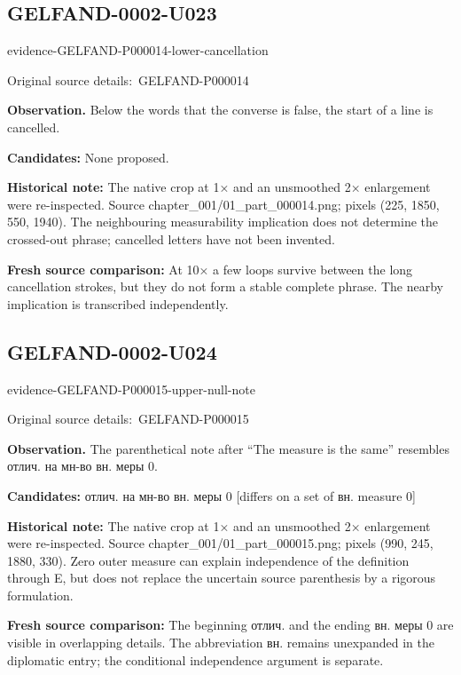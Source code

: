 \documentclass[11pt]{article}
\newcommand{\EvidenceBlock}[4]{%
 \par\smallskip\noindent\begin{minipage}{\linewidth}
 \begin{minipage}[t]{.47\linewidth}\vspace{0pt}\centering
 \csname evidence-#1-#2\endcsname\par
 {\scriptsize\SourceCropCaption\ #1}\par
 \end{minipage}\hfill
 \begin{minipage}[t]{.49\linewidth}\vspace{0pt}\raggedright
 {\small\color{orange!65!black}\textbf{#4} #3}\par
 \end{minipage}
 \end{minipage}\par\smallskip}
\newcommand{\SourceCropCaption}{Original source details:}\newcommand{\ReadingCaption}{Uncertain reading.}\newcommand{\IncompleteCaption}{Undeciphered passage.}\newcommand{\DiagramCaption}{Diagram and typed description.}
\begin{document}
\subsection*{GELFAND-0002-U023}
\EvidenceBlock{GELFAND-P000014}{lower-cancellation}{Below the words that the converse is false, the start of a line is cancelled.}{Observation.}
\par\smallskip\noindent\textbf{Candidates: } None proposed.\par
\par\smallskip\noindent\textbf{Historical note: } The native crop at 1× and an unsmoothed 2× enlargement were re-inspected. Source chapter\_001/01\_part\_000014.png; pixels (225, 1850, 550, 1940). The neighbouring measurability implication does not determine the crossed-out phrase; cancelled letters have not been invented.\par
\par\smallskip\noindent\textbf{Fresh source comparison: } At 10× a few loops survive between the long cancellation strokes, but they do not form a stable complete phrase. The nearby implication is transcribed independently.\par

\subsection*{GELFAND-0002-U024}
\EvidenceBlock{GELFAND-P000015}{upper-null-note}{The parenthetical note after “The measure is the same” resembles отлич. на мн-во вн. меры 0.}{Observation.}
\par\smallskip\noindent\textbf{Candidates: } отлич. на мн-во вн. меры 0 [differs on a set of вн. measure 0]\par
\par\smallskip\noindent\textbf{Historical note: } The native crop at 1× and an unsmoothed 2× enlargement were re-inspected. Source chapter\_001/01\_part\_000015.png; pixels (990, 245, 1880, 330). Zero outer measure can explain independence of the definition through E, but does not replace the uncertain source parenthesis by a rigorous formulation.\par
\par\smallskip\noindent\textbf{Fresh source comparison: } The beginning отлич. and the ending вн. меры 0 are visible in overlapping details. The abbreviation вн. remains unexpanded in the diplomatic entry; the conditional independence argument is separate.\par
\end{document}
